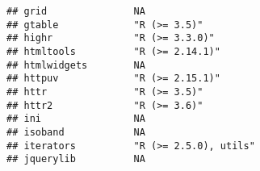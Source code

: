 \documentclass[
]{article}
\begin{document}
\begin{verbatim}
## grid               NA                                                                                                                                                                                                    
## gtable             "R (>= 3.5)"                                                                                                                                                                                          
## highr              "R (>= 3.3.0)"                                                                                                                                                                                        
## htmltools          "R (>= 2.14.1)"                                                                                                                                                                                       
## htmlwidgets        NA                                                                                                                                                                                                    
## httpuv             "R (>= 2.15.1)"                                                                                                                                                                                       
## httr               "R (>= 3.5)"                                                                                                                                                                                          
## httr2              "R (>= 3.6)"                                                                                                                                                                                          
## ini                NA                                                                                                                                                                                                    
## isoband            NA                                                                                                                                                                                                    
## iterators          "R (>= 2.5.0), utils"                                                                                                                                                                                 
## jquerylib          NA                                                                                                                                                                                                    

\end{verbatim}
\end{document}
